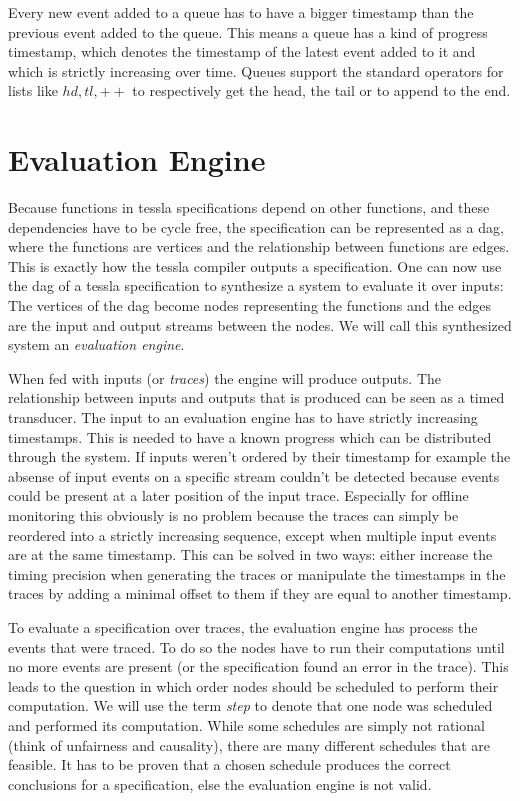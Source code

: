 Every new event added to a queue has to have a bigger timestamp than the previous event added to the queue.
This means a queue has a kind of progress timestamp, which denotes the timestamp of the latest event added to it and which is strictly increasing over time.
Queues support the standard operators for lists like \(\mathit{hd}, \mathit{tl}, ++\) to respectively get the head, the tail or to append to the end.


\section{ Evaluation Engine}
\label{sec:definitions:eval_engine}

Because functions in \gls{tessla} specifications depend on other functions, and these dependencies have to be cycle free, the specification can be represented as a \gls{dag}, where the functions are vertices and the relationship between functions are edges.
This is exactly how the \gls{tessla} compiler outputs a specification.
One can now use the \gls{dag} of a \gls{tessla} specification to synthesize a system to evaluate it over inputs:
The vertices of the \gls{dag} become nodes representing the functions and the edges are the input and output streams between the nodes.
We will call this synthesized system an \emph{evaluation engine}.

When fed with inputs (or \emph{traces}) the engine will produce outputs.
The relationship between inputs and outputs that is produced can be seen as a timed transducer.
The input to an evaluation engine has to have strictly increasing timestamps.
This is needed to have a known progress which can be distributed through the system.
If inputs weren't ordered by their timestamp for example the absense of input events on a specific stream couldn't be detected because events could be present at a later position of the input trace.
Especially for offline monitoring this obviously is no problem because the traces can simply be reordered into a strictly increasing sequence, except when multiple input events are at the same timestamp.
This can be solved in two ways: either increase the timing precision when generating the traces or manipulate the timestamps in the traces by adding a minimal offset to them if they are equal to another timestamp.

To evaluate a specification over traces, the evaluation engine has process the events that were traced.
To do so the nodes have to run their computations until no more events are present (or the specification found an error in the trace).
This leads to the question in which order nodes should be scheduled to perform their computation.
We will use the term \emph{step} to denote that one node was scheduled and performed its computation.
While some schedules are simply not rational (think of unfairness and causality), there are many different schedules that are feasible.
It has to be proven that a chosen schedule produces the correct conclusions for a specification, else the evaluation engine is not valid.

